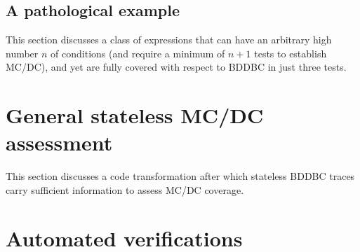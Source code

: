 \documentclass[a4paper,12pt,twoside]{article}
\begin{document}
\subsection{A pathological example}

This section discusses a class of expressions that can have an arbitrary
high number $n$ of conditions (and require a minimum of $n+1$ tests to
establish MC/DC), and yet are fully covered with respect to BDDBC in
just three tests.

\section{General stateless MC/DC assessment}

This section discusses a code transformation after which stateless BDDBC
traces carry sufficient information to assess MC/DC coverage.

\section{Automated verifications}

\newpage


\end{document}
